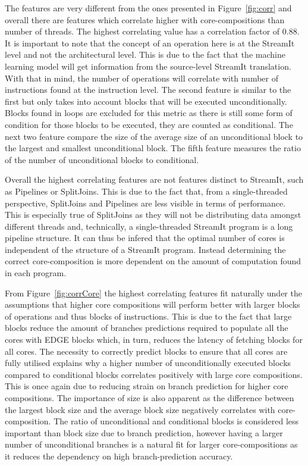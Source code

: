 The features are very different from the ones presented in Figure~\ref{fig:corr} and overall there are features which correlate higher with core-compositions than number of threads.
The highest correlating value has a correlation factor of 0.88.
It is important to note that the concept of an operation here is at the StreamIt level and not the architectural level.
This is due to the fact that the machine learning model will get information from the source-level StreamIt translation.
With that in mind, the number of operations will correlate with number of instructions found at the instruction level.
The second feature is similar to the first but only takes into account blocks that will be executed unconditionally.
Blocks found in loops are excluded for this metric as there is still some form of condition for those blocks to be executed, they are counted as conditional.
The next two feature compare the size of the average size of an unconditional block to the largest and smallest unconditional block.
The fifth feature measures the ratio of the number of unconditional blocks to conditional.

Overall the highest correlating features are not features distinct to StreamIt, such as Pipelines or SplitJoins.
This is due to the fact that, from a single-threaded perspective, SplitJoins and Pipelines are less visible in terms of performance.
This is especially true of SplitJoins as they will not be distributing data amongst different threads and, technically, a single-threaded StreamIt program is a long pipeline structure.
It can thus be infered that the optimal number of cores is independent of the structure of a StreamIt program.
Instead determining the correct core-composition is more dependent on the amount of computation found in each program.

From Figure~\ref{fig:corrCore} the highest correlating features fit naturally under the assumptions that higher core compositions will perform better with larger blocks of operations and thus blocks of instructions.
This is due to the fact that large blocks reduce the amount of branches predictions required to populate all the cores with EDGE blocks which, in turn, reduces the latency of fetching blocks for all cores.
The necessity to correctly predict blocks to ensure that all cores are fully utilised explains why a higher number of unconditionally executed blocks compared to conditional blocks correlates positively with large core compositions.
This is once again due to reducing strain on branch prediction for higher core compositions.
The importance of size is also apparent as the difference between the largest block size and the average block size negatively correlates with core-composition.
The ratio of unconditional and conditional blocks is considered less important than block size due to branch prediction, however having a larger number of unconditional branches is a natural fit for larger core-compositions as it reduces the dependency on high branch-prediction accuracy.

